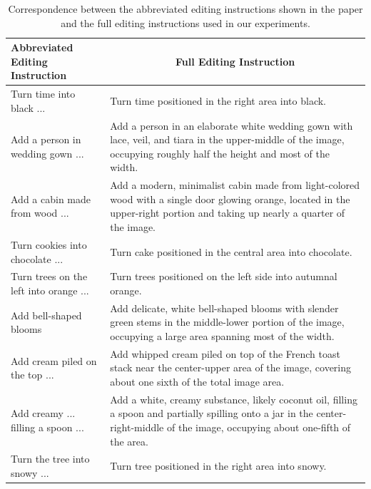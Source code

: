 \begin{table}[htbp]
\centering
\small
\caption{
Correspondence between the abbreviated editing instructions shown in the paper and the full editing instructions used in our experiments.
}
\setlength{\tabcolsep}{4pt}
\renewcommand{\arraystretch}{1.18}
\begin{tabularx}{\textwidth}{p{} X}
\toprule
\textbf{Abbreviated Editing Instruction} 
& \multicolumn{1}{c}{\textbf{Full Editing Instruction}} 
\\
\midrule

Turn time into black ...
& Turn time positioned in the right area into black.
\\
\midrule

Add a person in wedding gown ...
& Add a person in an elaborate white wedding gown with lace, veil, and tiara in the upper-middle of the image, occupying roughly half the height and most of the width.
\\
\midrule

Add a cabin made from wood ...
& Add a modern, minimalist cabin made from light-colored wood with a single door glowing orange, located in the upper-right portion and taking up nearly a quarter of the image.
\\
\midrule

Turn cookies into chocolate ...
& Turn cake positioned in the central area into chocolate.
\\
\midrule

Turn trees on the left into orange ...
& Turn trees positioned on the left side into autumnal orange.
\\
\midrule

Add bell-shaped blooms
& Add delicate, white bell-shaped blooms with slender green stems in the middle-lower portion of the image, occupying a large area spanning most of the width.
\\
\midrule

Add cream piled on the top ...
& Add whipped cream piled on top of the French toast stack near the center-upper area of the image, covering about one sixth of the total image area.
\\
\midrule

Add creamy ... filling a spoon ...
& Add a white, creamy substance, likely coconut oil, filling a spoon and partially spilling onto a jar in the center-right-middle of the image, occupying about one-fifth of the area.
\\
\midrule

Turn the tree into snowy ...
& Turn tree positioned in the right area into snowy.
\\
\midrule


\end{tabularx}
\end{table}
